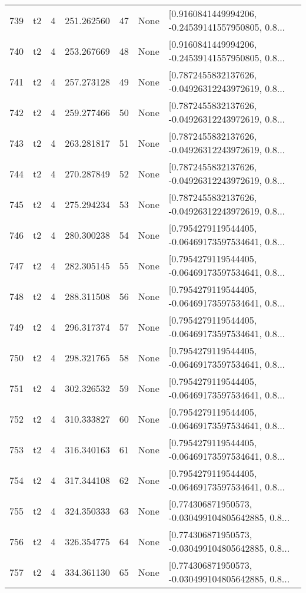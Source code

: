 \begin{tabular}{lllrlll}
739 &  t2 &   4 &   251.262560 &   47 &  None &  [0.9160841449994206, -0.24539141557950805, 0.8... \\
740 &  t2 &   4 &   253.267669 &   48 &  None &  [0.9160841449994206, -0.24539141557950805, 0.8... \\
741 &  t2 &   4 &   257.273128 &   49 &  None &  [0.7872455832137626, -0.04926312243972619, 0.8... \\
742 &  t2 &   4 &   259.277466 &   50 &  None &  [0.7872455832137626, -0.04926312243972619, 0.8... \\
743 &  t2 &   4 &   263.281817 &   51 &  None &  [0.7872455832137626, -0.04926312243972619, 0.8... \\
744 &  t2 &   4 &   270.287849 &   52 &  None &  [0.7872455832137626, -0.04926312243972619, 0.8... \\
745 &  t2 &   4 &   275.294234 &   53 &  None &  [0.7872455832137626, -0.04926312243972619, 0.8... \\
746 &  t2 &   4 &   280.300238 &   54 &  None &  [0.7954279119544405, -0.06469173597534641, 0.8... \\
747 &  t2 &   4 &   282.305145 &   55 &  None &  [0.7954279119544405, -0.06469173597534641, 0.8... \\
748 &  t2 &   4 &   288.311508 &   56 &  None &  [0.7954279119544405, -0.06469173597534641, 0.8... \\
749 &  t2 &   4 &   296.317374 &   57 &  None &  [0.7954279119544405, -0.06469173597534641, 0.8... \\
750 &  t2 &   4 &   298.321765 &   58 &  None &  [0.7954279119544405, -0.06469173597534641, 0.8... \\
751 &  t2 &   4 &   302.326532 &   59 &  None &  [0.7954279119544405, -0.06469173597534641, 0.8... \\
752 &  t2 &   4 &   310.333827 &   60 &  None &  [0.7954279119544405, -0.06469173597534641, 0.8... \\
753 &  t2 &   4 &   316.340163 &   61 &  None &  [0.7954279119544405, -0.06469173597534641, 0.8... \\
754 &  t2 &   4 &   317.344108 &   62 &  None &  [0.7954279119544405, -0.06469173597534641, 0.8... \\
755 &  t2 &   4 &   324.350333 &   63 &  None &  [0.774306871950573, -0.030499104805642885, 0.8... \\
756 &  t2 &   4 &   326.354775 &   64 &  None &  [0.774306871950573, -0.030499104805642885, 0.8... \\
757 &  t2 &   4 &   334.361130 &   65 &  None &  [0.774306871950573, -0.030499104805642885, 0.8... \\

\end{tabular}
